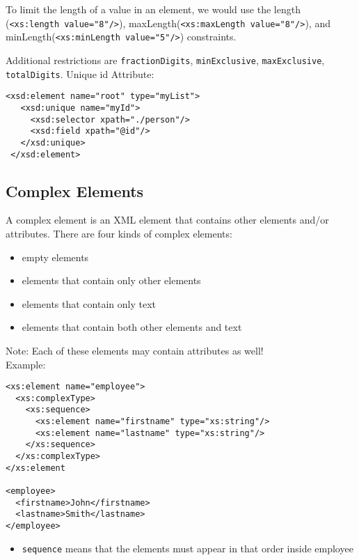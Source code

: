 \documentclass[11pt]{article}
\begin{document}
To limit the length of a value in an element, we would use the length (\texttt{<xs:length value="8"/>}), maxLength(\texttt{<xs:maxLength value="8"/>}), and minLength(\texttt{<xs:minLength value="5"/>}) constraints.

Additional restrictions are \texttt{fractionDigits}, \texttt{minExclusive}, \texttt{maxExclusive}, \texttt{totalDigits}.
Unique id Attribute:
\lstset{breaklines=true,language=XML,label= ,caption= ,captionpos=b,numbers=none}
\begin{lstlisting}
<xsd:element name="root" type="myList">
   <xsd:unique name="myId">
     <xsd:selector xpath="./person"/>
     <xsd:field xpath="@id"/>
   </xsd:unique>
 </xsd:element>
\end{lstlisting}

\subsection{Complex Elements}
\label{sec:org82db7ac}
A complex element is an XML element that contains other elements and/or attributes.
There are four kinds of complex elements:
\begin{itemize}
\item empty elements
\item elements that contain only other elements
\item elements that contain only text
\item elements that contain both other elements and text
\end{itemize}
Note: Each of these elements may contain attributes as well!\\
Example:
\lstset{breaklines=true,language=XML,label= ,caption= ,captionpos=b,numbers=none}
\begin{lstlisting}
<xs:element name="employee">
  <xs:complexType>
    <xs:sequence>
      <xs:element name="firstname" type="xs:string"/>
      <xs:element name="lastname" type="xs:string"/>
    </xs:sequence>
  </xs:complexType>
</xs:element

<employee>
  <firstname>John</firstname>
  <lastname>Smith</lastname>
</employee>
\end{lstlisting}
\begin{itemize}
\item \texttt{sequence} means that the elements must appear in that order inside employee
\end{itemize}
\end{document}
